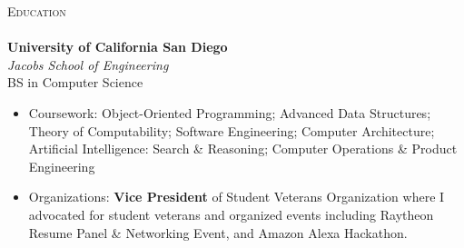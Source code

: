 \documentclass[a4paper]{article}
\newcommand{\lineunder} {
    \vspace*{-8pt} \\
    \hspace*{-18pt} \hrulefill \\
}
\newcommand{\header} [1] {
    {\hspace*{-18pt}\vspace*{6pt} \textsc{#1}}
    \vspace*{-6pt} \lineunder
}
\begin{document}
\header{Education}
\textbf{University of California San Diego}\hfill \\
\textit{Jacobs School of Engineering} \\
BS in Computer Science \hfill \\
\begin{itemize} \itemsep 1pt
	\item Coursework: Object-Oriented Programming; Advanced Data Structures; Theory of Computability; Software Engineering; Computer Architecture; Artificial Intelligence: Search \& Reasoning; Computer Operations \& Product Engineering \\
	\item Organizations: \textbf{Vice President} of Student Veterans Organization where I advocated for student veterans and organized events including Raytheon Resume Panel \& Networking Event, and Amazon Alexa Hackathon.
\end{itemize}

\vspace{2mm}
\end{document}
